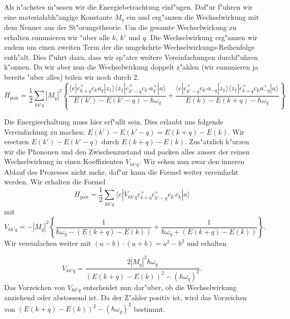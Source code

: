 \begin{refsection}
Als n"achstes m"ussen wir die Energiebetrachtung einf"ugen.
Daf"ur f"uhren wir eine materialabh"angige Konstante $M_q$ ein und erg"anzen die
Wechselwirkung mit dem Nenner aus der St"orungstheorie.
Um die gesamte Wechselwirkung zu erhalten summieren wir "uber alle $k$, $k'$ und $q$.
Die Wechselwirkung erg"anzen wir zudem um einen zweiten Term der die umgekehrte
Wechselwirkungs-Reihenfolge enth"alt.
Dies f"uhrt dazu, dass wir sp"ater weitere Vereinfachungen durchf"uhren k"onnen.
Da wir aber nun die Wechselwirkung doppelt z"ahlen (wir summieren ja bereits "uber alles)
teilen wir noch durch $2$.
\begin{equation}
H_{\text{pair}}=
\frac{1}{2}
\sum \limits_{kk'q} |M_q|^2
\left\{
\frac
{\langle e|c^+_{k+q} c_k a_q |z_1\rangle\langle z_1| c^+_{k'-q} c_{k'} a^+_q |a\rangle }
{E(k')-E(k'-q)-\hbar\omega_q}
+
\frac
{\langle e|c^+_{k'-q} c_{k'} a_{-q}|z_1\rangle\langle z_1| c^+_{k+q} c_k a^+_{-q} |a\rangle }
{E(k)-E(k+q)-\hbar\omega_q}
\right\}
\label{supraleitung:WechselwirkungME}
\end{equation}

Die Energieerhaltung muss hier erf"ullt sein. 
Dies erlaubt uns folgende Vereinfachung zu machen:
$E(k')-E(k'-q) = E(k+q)-E(k)$. Wir ersetzen $E(k')-E(k'-q)$ durch $E(k+q)-E(k)$.
Zus"atzlich k"urzen wir die Phononen und den Zwischenzustand und packen
alles ausser der reinen Wechselwirkung in einen Koeffizienten $V_{kk'q}$.
Wir sehen nun zwar den inneren Ablauf des Prozesses nicht mehr, daf"ur kann die Formel
weiter vereinfacht werden.
Wir erhalten die Formel
\begin{equation}
H_{\text{pair}}=
\frac{1}{2}
\sum \limits_{kk'q} 
\langle e|V_{kk'q}c^+_{k+q}c^+_{k'-q}c_{k'}c_k|a \rangle
\label{supraleitung:WechselwirkungKurz}
\end{equation}
mit
\begin{equation}
V_{kk'q} = - |M_q|^2 \left\{
\frac{1}{\hbar\omega_q-(E(k+q)-E(k))}
+
\frac{1}{\hbar\omega_q+(E(k+q)-E(k))}
\right\}
\label{supraleitung:WechselwirkungVkk'q}.
\end{equation}
Wir vereinfachen weiter mit $(a-b)\cdot (a+b) = a^2-b^2$ und erhalten

\begin{equation}
V_{kk'q} =
\frac
{2|M_q|^2\hbar\omega_q}
{(E(k+q)-E(k))^2-(\hbar\omega_q)^2}
\label{supraleitung:Wechselwirkung_Vkk'q_Kurz}.
\end{equation}
Das Vorzeichen von $V_{kk'q}$ entscheidet nun dar"uber, ob die Wechselwirkung
anziehend oder abstossend ist. Da der Z"ahler positiv ist, wird das Vorzeichen von $(E(k+q)-E(k))^2-(\hbar\omega_q)^2$ bestimmt.


\end{refsection}
